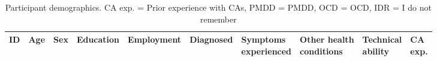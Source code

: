 
  
 
\begin{table}[t]
\scriptsize
\caption{Participant demographics. \ac{CA} exp. = Prior experience with \acp{CA}, PMDD = \acl{PMDD}, OCD = \acl{OCD}, IDR = I do not remember}
    
    \begin{tabular}{p{0.15cm} p{0.75cm} p{0.2cm} p{2cm} p{1.5cm} p{1.15cm} p{1.45cm} p{2cm} p{1.1cm} p{0.25cm}}
    
    \toprule
         \textbf{ID} & \textbf{Age} & \textbf{Sex} & \textbf{Education} & \textbf{Employment} & \textbf{Diagnosed} & \makecell[l]{\textbf{Symptoms}\\ \textbf{experienced}} & \makecell[l]{\textbf{Other health}\\ \textbf{conditions}} & \makecell[l]{\textbf{Technical}\\ \textbf{ability}} & \makecell[l]{\textbf{\ac{CA}}\\ \textbf{exp.}} \\
    \midrule 


\end{tabular}
\end{table}
